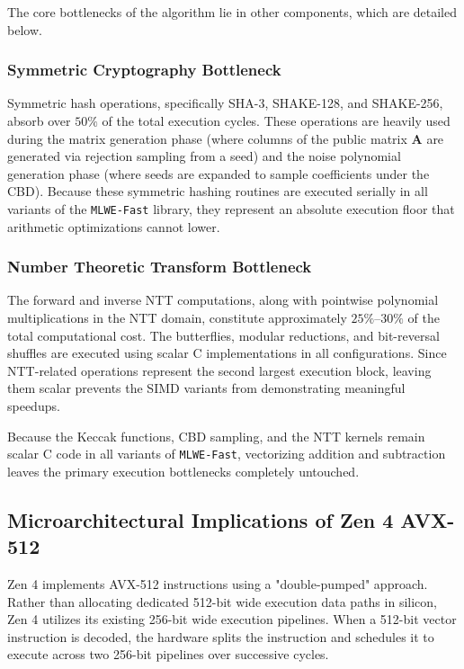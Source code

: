 The core bottlenecks of the algorithm lie in other components, which are detailed below.

\subsubsection{Symmetric Cryptography Bottleneck}
Symmetric hash operations, specifically SHA-3, SHAKE-128, and SHAKE-256, absorb over $50\%$ of the total execution cycles. These operations are heavily used during the matrix generation phase (where columns of the public matrix $\mathbf{A}$ are generated via rejection sampling from a seed) and the noise polynomial generation phase (where seeds are expanded to sample coefficients under the CBD). Because these symmetric hashing routines are executed serially in all variants of the \texttt{MLWE-Fast} library, they represent an absolute execution floor that arithmetic optimizations cannot lower.

\subsubsection{Number Theoretic Transform Bottleneck}
The forward and inverse NTT computations, along with pointwise polynomial multiplications in the NTT domain, constitute approximately $25\%\text{--}30\%$ of the total computational cost. The butterflies, modular reductions, and bit-reversal shuffles are executed using scalar C implementations in all configurations. Since NTT-related operations represent the second largest execution block, leaving them scalar prevents the SIMD variants from demonstrating meaningful speedups.

Because the Keccak functions, CBD sampling, and the NTT kernels remain scalar C code in all variants of \texttt{MLWE-Fast}, vectorizing addition and subtraction leaves the primary execution bottlenecks completely untouched.

\subsection{Microarchitectural Implications of Zen 4 AVX-512}
\label{sub:zen4_avx512_impl}

Zen 4 implements AVX-512 instructions using a "double-pumped" approach. Rather than allocating dedicated 512-bit wide execution data paths in silicon, Zen 4 utilizes its existing 256-bit wide execution pipelines. When a 512-bit vector instruction is decoded, the hardware splits the instruction and schedules it to execute across two 256-bit pipelines over successive cycles.

